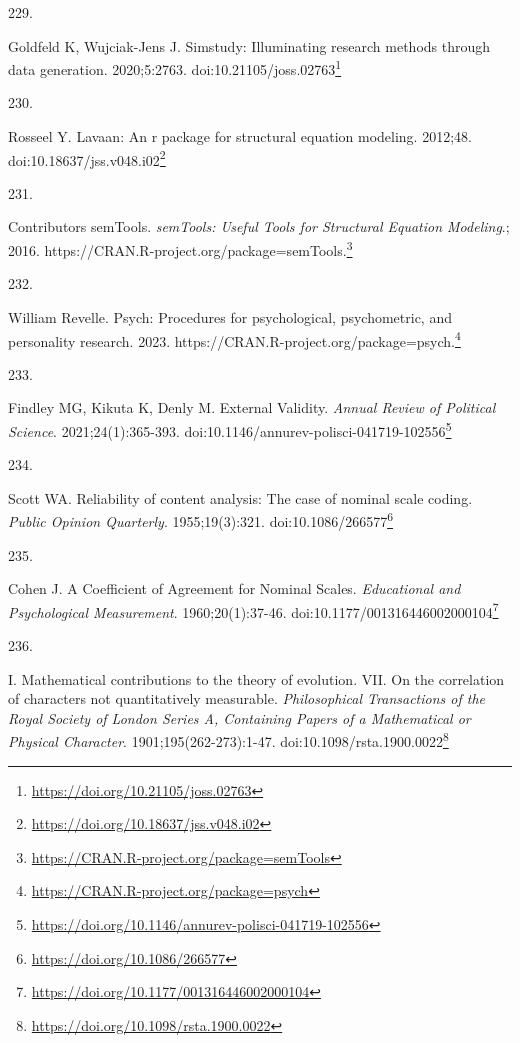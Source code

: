 \documentclass[
  a4paper,
]{book}
\newlength{\cslhangindent}
\newlength{\csllabelwidth}
\newlength{\cslentryspacingunit} %
\newenvironment{CSLReferences}[2] %
 {%
  \setlength{\parindent}{0pt}
  \ifodd #1
  \let\oldpar\par
  \def\par{\hangindent=\cslhangindent\oldpar}
  \fi
  \setlength{\parskip}{#2\cslentryspacingunit}
 }%
 {}
\newcommand{\CSLLeftMargin}[1]{\parbox[t]{\csllabelwidth}{#1}}
\newcommand{\CSLRightInline}[1]{\parbox[t]{\linewidth - \csllabelwidth}{#1}\break}
\renewcommand{\href}[2]{#2\footnote{\url{#1}}}
\begin{document}
\begin{CSLReferences}{0}{0}
\leavevmode{}%
\CSLLeftMargin{229. }%
\CSLRightInline{Goldfeld K, Wujciak-Jens J. Simstudy: Illuminating research methods through data generation. 2020;5:2763. doi:\href{https://doi.org/10.21105/joss.02763}{10.21105/joss.02763}}

\leavevmode{}%
\CSLLeftMargin{230. }%
\CSLRightInline{Rosseel Y. {\textbraceleft}Lavaan{\textbraceright}: An {\textbraceleft}r{\textbraceright} package for structural equation modeling. 2012;48. doi:\href{https://doi.org/10.18637/jss.v048.i02}{10.18637/jss.v048.i02}}

\leavevmode{}%
\CSLLeftMargin{231. }%
\CSLRightInline{Contributors semTools. \emph{{semTools}: Useful Tools for Structural Equation Modeling}.; 2016. \href{https://CRAN.R-project.org/package=semTools}{https://CRAN.R-project.org/package=semTools.}}

\leavevmode{}%
\CSLLeftMargin{232. }%
\CSLRightInline{William Revelle. Psych: Procedures for psychological, psychometric, and personality research. 2023. \href{https://CRAN.R-project.org/package=psych}{https://CRAN.R-project.org/package=psych.}}

\leavevmode{}%
\CSLLeftMargin{233. }%
\CSLRightInline{Findley MG, Kikuta K, Denly M. External Validity. \emph{Annual Review of Political Science}. 2021;24(1):365-393. doi:\href{https://doi.org/10.1146/annurev-polisci-041719-102556}{10.1146/annurev-polisci-041719-102556}}

\leavevmode{}%
\CSLLeftMargin{234. }%
\CSLRightInline{Scott WA. Reliability of content analysis: The case of nominal scale coding. \emph{Public Opinion Quarterly}. 1955;19(3):321. doi:\href{https://doi.org/10.1086/266577}{10.1086/266577}}

\leavevmode{}%
\CSLLeftMargin{235. }%
\CSLRightInline{Cohen J. A Coefficient of Agreement for Nominal Scales. \emph{Educational and Psychological Measurement}. 1960;20(1):37-46. doi:\href{https://doi.org/10.1177/001316446002000104}{10.1177/001316446002000104}}

\leavevmode{}%
\CSLLeftMargin{236. }%
\CSLRightInline{I. Mathematical contributions to the theory of evolution. {\textemdash}VII. On the correlation of characters not quantitatively measurable. \emph{Philosophical Transactions of the Royal Society of London Series A, Containing Papers of a Mathematical or Physical Character}. 1901;195(262-273):1-47. doi:\href{https://doi.org/10.1098/rsta.1900.0022}{10.1098/rsta.1900.0022}}


\end{CSLReferences}
\end{document}

